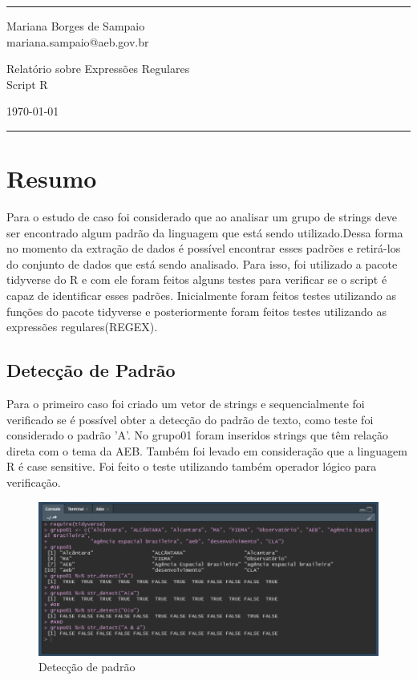 \documentclass[a4paper]{article}
\begin{document}

\fancyhead[C]{}
\hrule \medskip %
\begin{minipage}{0.295\textwidth} 
\raggedright
\footnotesize
Mariana Borges de Sampaio \hfill\\   
mariana.sampaio@aeb.gov.br
\end{minipage}
\begin{minipage}{0.4\textwidth} 
\centering 
\large 
Relatório sobre Expressões Regulares\\ 
\normalsize 
Script R\\ 
\end{minipage}
\begin{minipage}{0.295\textwidth} 
\raggedleft
\today\hfill\\
\end{minipage}
\medskip\hrule 
\bigskip


\section{Resumo}
Para o estudo de caso foi considerado que ao analisar um grupo de strings deve ser encontrado algum padrão da linguagem que está sendo utilizado.Dessa forma no momento da extração de dados é possível encontrar esses padrões e retirá-los do conjunto de dados que está sendo analisado. Para isso, foi utilizado a pacote tidyverse do R e com ele foram feitos alguns testes para verificar se o script é capaz de identificar esses padrões.
Inicialmente foram feitos testes utilizando as funções do pacote tidyverse e posteriormente foram feitos testes utilizando as expressões regulares(REGEX).

\subsection{Detecção de Padrão}
Para o primeiro caso foi criado um vetor de strings e sequencialmente foi verificado se é possível obter a detecção do padrão de texto, como teste foi considerado o padrão 'A'. No grupo01 foram inseridos strings que têm relação direta com o tema da AEB. Também foi levado em consideração que a linguagem R é case sensitive. Foi feito o teste utilizando também operador lógico para verificação. 
\begin{figure}[htb!]
    \centering
    \includegraphics[width=0.7\linewidth]{style/image/caso01.png}
    \caption{Detecção de padrão}
    \label{fig:Detecção}
\end{figure}
\end{document}
